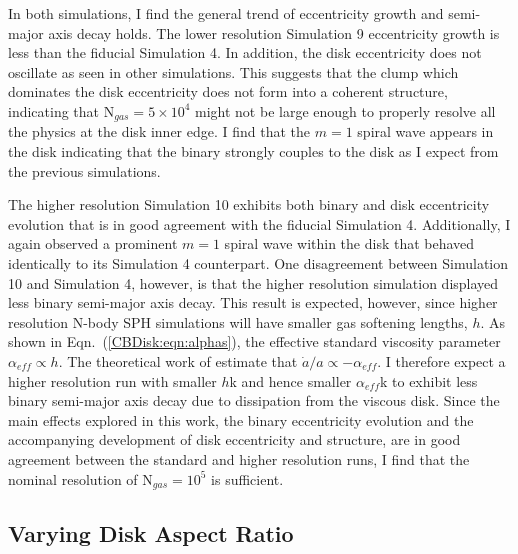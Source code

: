  In both simulations, I find the general trend of eccentricity growth and semi-major axis decay holds.  The lower resolution Simulation 9 eccentricity 
 growth is less than the fiducial Simulation 4.  In addition, the disk eccentricity does not oscillate as seen in other simulations.  This suggests that the clump 
 which dominates the disk eccentricity does not form into a coherent structure, indicating that N$_{gas} = 5 \times 
 10^4$ might not be large enough to properly resolve all the physics at the disk inner edge.  I find that the $m = 1$ spiral wave appears in the disk indicating 
 that the binary strongly couples to the disk as I expect from the previous simulations.
 
 The higher resolution Simulation 10 exhibits both binary and disk eccentricity evolution that is in good agreement with the fiducial Simulation 4.  
 Additionally, I again observed a prominent $m = 1$ spiral wave within the disk that behaved identically to its Simulation 4 counterpart.  One disagreement 
 between Simulation 10 and Simulation 4, however, is that the higher resolution simulation displayed less binary semi-major axis decay.  This result is expected, 
 however, since higher resolution N-body SPH simulations will have smaller gas softening lengths, $h$.  As shown in Eqn.~(\ref{CBDisk:eqn:alphas}), the effective 
 standard viscosity parameter $\alpha_{eff} \propto h$.  The theoretical work of \citet{Artymowicz1996b,Artymowicz2000} estimate that $\dot{a}/a 
 \propto -\alpha_{eff}$.  I therefore expect a higher resolution run with smaller $h$k and hence smaller $\alpha_{eff}$k to exhibit less binary semi-major axis 
 decay due to dissipation from the viscous disk. Since the main effects explored in this work, the binary eccentricity evolution and the accompanying development of disk eccentricity and structure, are in good agreement between the standard and higher resolution runs, I find that the nominal resolution of N$_{gas} = 10^5$ is sufficient.

	
\subsection{Varying Disk Aspect Ratio}

